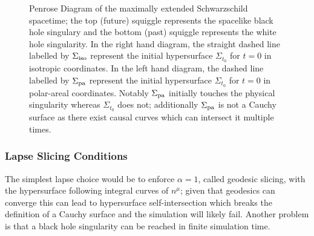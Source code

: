   \begin{figure}[h]
  \caption{Penrose Diagram of the maximally extended Schwarzschild spacetime; the top (future) squiggle represents the spacelike black hole singulary and the bottom (past) squiggle represents the white hole singularity. In the right hand diagram, the straight dashed line labelled by $\Sigma_{\rm iso}$ represent the initial hypersurface $\Sigma_{t_0}$ for $t=0$ in isotropic coordinates. In the left hand diagram, the dashed line labelled by $\Sigma_{\rm pa}$ represent the initial hypersurface $\Sigma_{t_0}$ for $t=0$ in polar-areal coordinates. Notably $\Sigma_{\rm pa}$ initially touches the physical singularity whereas $\Sigma_{t_0}$ does not; additionally $\Sigma_{\rm pa}$ is not a Cauchy surface as there exist causal curves which can intersect it multiple times.}
  \centering
   \hfill
  \label{nr:fig:eddington-finkelstein}\label{nr:fig:isotropic}\label{boson:fig:f1}
\end{figure}

\subsubsection{Lapse Slicing Conditions}

The simplest lapse choice would be to enforce $\alpha=1$, called geodesic slicing, with the hypersurface following integral curves of $n^\mu$; given that geodesics can converge this can lead to hypersurface self-intersection which breaks the definition of a Cauchy surface and the simulation will likely fail. Another problem is that a black hole singularity can be reached in finite simulation time.

